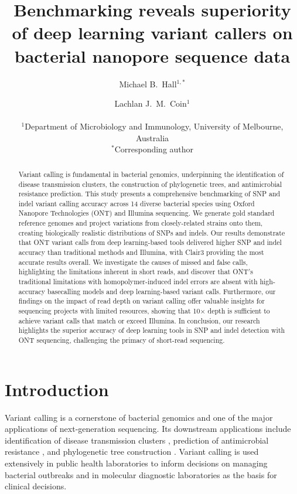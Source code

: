 \documentclass[11pt]{article}
\title{Benchmarking reveals superiority of deep learning variant callers on bacterial nanopore sequence data}
\author{
Michael B.\ Hall$^{1,*}$ \and Lachlan J.\ M.\ Coin$^{1}$\\
\\
\small $^{1}$Department of Microbiology and Immunology, University of Melbourne, Australia\\
\small $^{*}$Corresponding author
}
\date{}
\begin{document}
\maketitle

\begin{abstract}
Variant calling is fundamental in bacterial genomics, underpinning the identification of disease transmission clusters, the construction of phylogenetic trees, and antimicrobial resistance prediction. This study presents a comprehensive benchmarking of SNP and indel variant calling accuracy across 14 diverse bacterial species using Oxford Nanopore Technologies (ONT) and Illumina sequencing. We generate gold standard reference genomes and project variations from closely-related strains onto them, creating biologically realistic distributions of SNPs and indels. Our results demonstrate that ONT variant calls from deep learning-based tools delivered higher SNP and indel accuracy than traditional methods and Illumina, with Clair3 providing the most accurate results overall. We investigate the causes of missed and false calls, highlighting the limitations inherent in short reads, and discover that ONT's traditional limitations with homopolymer-induced indel errors are absent with high-accuracy basecalling models and deep learning-based variant calls. Furthermore, our findings on the impact of read depth on variant calling offer valuable insights for sequencing projects with limited resources, showing that 10$\times$ depth is sufficient to achieve variant calls that match or exceed Illumina. In conclusion, our research highlights the superior accuracy of deep learning tools in SNP and indel detection with ONT sequencing, challenging the primacy of short-read sequencing.
\end{abstract}

\section{Introduction}

Variant calling is a cornerstone of bacterial genomics and one of the major applications of next-generation sequencing. Its downstream applications include identification of disease transmission clusters \citep{stimson2019}, prediction of antimicrobial resistance \citep{luo2022,hunt2023}, and phylogenetic tree construction \citep{croucher2014}. Variant calling is used extensively in public health laboratories to inform decisions on managing bacterial outbreaks \citep{malone2021} and in molecular diagnostic laboratories as the basis for clinical decisions.
\end{document}

